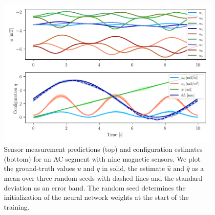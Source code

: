 \begin{figure}[hbt]
  \centering
  \includegraphics[width=0.8\columnwidth]{promasens/figures/simulation_results/ac/affine_curvature_inference_v2_cropped.pdf}
  \caption{Sensor measurement predictions (top) and configuration estimates (bottom) for an \gls{AC} segment with nine magnetic sensors. We plot the ground-truth values $u$ and $q$ in solid, the estimate $\hat{u}$ and $\hat{q}$ as a mean over three random seeds with dashed lines and the standard deviation as an error band. The random seed determines the initialization of the neural network weights at the start of the training.}
  \label{fig:promasens:ac_simulations:inference_plot}
\end{figure}

